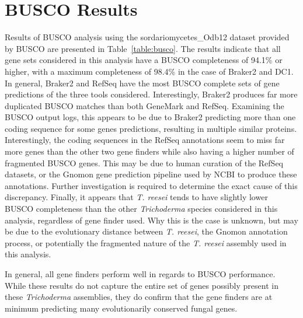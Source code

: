 \section{BUSCO Results}
\label{section:busco}

Results of BUSCO analysis using the sordariomycetes\_Odb12 dataset provided by BUSCO are presented in Table~\ref{table:busco}. The results 
indicate that all gene sets considered in this analysis have a BUSCO
completeness of 94.1\% or higher, with a maximum completeness of
98.4\% in the case of Braker2 and DC1. In general, Braker2 and RefSeq have the
most BUSCO complete sets of gene predictions of the three tools
considered. Interestingly, Braker2 produces far more duplicated BUSCO
matches than both GeneMark and RefSeq. Examining the BUSCO output
logs, this appears to be due to Braker2 predicting more than one
coding sequence for some genes predictions, resulting in multiple
similar proteins. Interestingly, the coding sequences in the RefSeq annotations seem to miss far more genes than the other two gene finders while also having a higher number of fragmented BUSCO genes. This may be due to human curation of the RefSeq datasets, or the Gnomon gene prediction pipeline used by NCBI to produce these annotations. Further investigation is required to determine the exact cause of this discrepancy. Finally, it appears that \textit{T. reesei} tends to have slightly lower BUSCO completeness than the other \textit{Trichoderma} species considered in this analysis, regardless of gene finder used. Why this is the case is unknown, but may be due to the evolutionary distance between \textit{T. reesei}, the Gnomon annotation process, or potentially the fragmented nature of the \textit{T. reesei} assembly used in this analysis. 

In general, all gene finders perform
well in regards to BUSCO performance. While these results do not
capture the entire set of genes possibly present in these
\textit{Trichoderma} assemblies, they do confirm that the gene finders
are at minimum predicting many evolutionarily conserved fungal genes.

